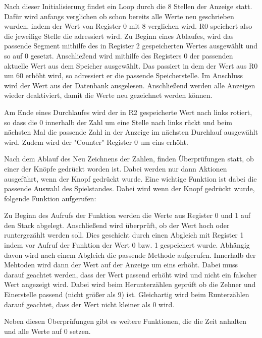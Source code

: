 Nach dieser Initialisierung findet ein Loop durch die 8 Stellen der Anzeige statt. Dafür wird anfangs verglichen ob schon bereits alle Werte neu geschrieben wurden, indem der Wert von Register 0 mit 8 verglichen wird. R0 speichert also die jeweilige Stelle die adressiert wird. Zu Beginn eines Ablaufes, wird das passende Segment mithilfe des in Register 2 gespeicherten Wertes ausgewählt und so auf 0 gesetzt. Anschließend wird mithilfe des Registers 0 der passenden aktuelle Wert aus dem Speicher ausgewählt. Das passiert in dem der Wert aus R0 um 60 erhöht wird, so adressiert er die passende Speicherstelle. Im Anschluss wird der Wert aus der Datenbank ausgelesen. Anschließend werden alle Anzeigen wieder deaktiviert, damit die Werte neu gezeichnet werden können. 

Am Ende eines Durchlaufes wird der in R2 gespeicherte Wert nach links rotiert, so dass die 0 innerhalb der Zahl um eine Stelle nach links rückt und beim nächsten Mal die passende Zahl in der Anzeige im nächsten Durchlauf ausgewählt wird. Zudem wird der "Counter" Register 0 um eins erhöht.

Nach dem Ablauf des Neu Zeichnens der Zahlen, finden Überprüfungen statt, ob einer der Knöpfe gedrückt worden ist. Dabei werden nur dann Aktionen ausgeführt, wenn der Knopf gedrückt wurde. Eine wichtige Funktion ist dabei die passende Auswahl des Spielstandes. Dabei wird wenn der Knopf gedrückt wurde, folgende Funktion aufgerufen:


Zu Beginn des Aufrufs der Funktion werden die Werte aus Register 0 und 1 auf den Stack abgelegt. Anschließend wird überprüft, ob der Wert hoch oder runtergezählt werden soll. Dies geschieht durch einen Abgleich mit Register 1 indem vor Aufruf der Funktion der Wert 0 bzw. 1 gespeichert wurde. Abhängig davon wird nach einem Abgleich die passende Methode aufgerufen. Innerhalb der Mehtoden wird dann der Wert auf der Anzeige um eins erhöht. Dabei muss darauf geachtet werden, dass der Wert passend erhöht wird und nicht ein falscher Wert angezeigt wird. Dabei wird beim Herunterzählen geprüft ob die Zehner und Einerstelle passend (nicht größer als 9) ist. Gleichartig  wird beim Runterzählen darauf geachtet, dass der Wert nicht kleiner als 0 wird. 

Neben diesen Überprüfungen gibt es weitere Funktionen, die die Zeit anhalten und alle Werte auf 0 setzen.



